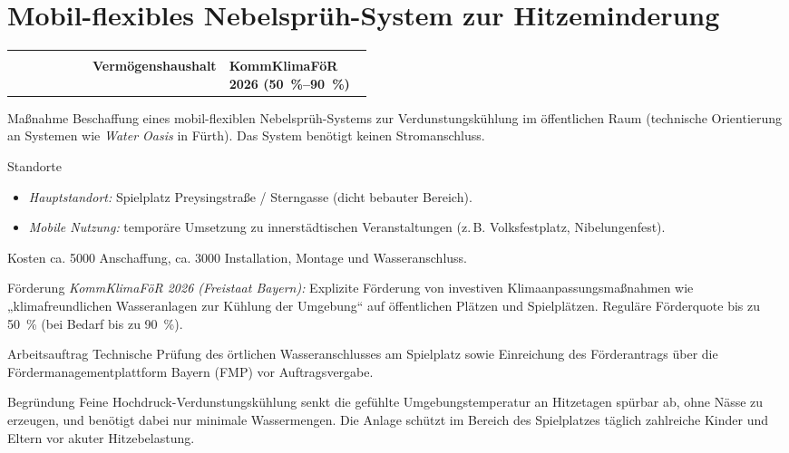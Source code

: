 \documentclass[11pt, a4paper]{article}
\makeatletter
\newcommand{\rubrik}[1]{{\small\bfseries\color{GruenAccent}\textls[80]{\MakeUppercase{#1}}}}
\newcommand{\kennzahl}[1]{\leavevmode{\scriptsize\color{Grau}\textls[60]{\MakeUppercase{#1}}}}
\newcommand{\massnahme}[3]{%
  \rubrik{#1}\par\nobreak\vspace{1mm}%
  \section{#2}\label{#3}}
\newcommand{\eckdaten}[3]{%
  \begin{tcolorbox}[enhanced, colback=GruenLight, frame hidden, arc=1.5mm,
      left=5mm, right=5mm, top=2.5mm, bottom=2.5mm, before skip=0pt, after skip=5mm]
    \begin{tabularx}{\linewidth}{@{}p{0.22\linewidth} p{0.24\linewidth} >{\raggedright\arraybackslash}X@{}}
      \kennzahl{Ansatz 2027} & \kennzahl{Haushalt} & \kennzahl{Förderung / Finanzierung} \\[0.5mm]
      \leavevmode{\Large\bfseries\color{GruenPrimary}#1} & \bfseries #2 & \bfseries #3
    \end{tabularx}
  \end{tcolorbox}}
\makeatother
\begin{document}
\clearpage


\massnahme{Hitzeschutz}{Mobil-flexibles Nebelsprüh-System zur Hitzeminderung}{m:nebel}

\eckdaten{\qty{8000}{\EUR}}{Vermögenshaushalt}{KommKlimaFöR 2026 (\SIrange{50}{90}{\percent})}

\begin{steckbrief}
  \item[Maßnahme] Beschaffung eines mobil-flexiblen Nebelsprüh-Systems zur Verdunstungskühlung im öffentlichen Raum (technische Orientierung an Systemen wie \textit{Water Oasis} in Fürth). Das System benötigt keinen Stromanschluss.
  \item[Standorte] \begin{itemize}
      \item \textit{Hauptstandort:} Spielplatz Preysingstraße / Sterngasse (dicht bebauter Bereich).
      \item \textit{Mobile Nutzung:} temporäre Umsetzung zu innerstädtischen Veranstaltungen (z.\,B. Volksfestplatz, Nibelungenfest).
    \end{itemize}
  \item[Kosten] ca. \qty{5000}{\EUR} Anschaffung, ca. \qty{3000}{\EUR} Installation, Montage und Wasseranschluss.
  \item[Förderung] \textit{KommKlimaFöR 2026 (Freistaat Bayern):} Explizite Förderung von investiven Klimaanpassungsmaßnahmen wie „klimafreundlichen Wasseranlagen zur Kühlung der Umgebung“ auf öffentlichen Plätzen und Spielplätzen. Reguläre Förderquote bis zu \SI{50}{\percent} (bei Bedarf bis zu \SI{90}{\percent}).
  \item[Arbeitsauftrag] Technische Prüfung des örtlichen Wasseranschlusses am Spielplatz sowie Einreichung des Förderantrags über die Fördermanagementplattform Bayern (FMP) vor Auftragsvergabe.
  \item[Begründung] Feine Hochdruck-Verdunstungskühlung senkt die gefühlte Umgebungstemperatur an Hitzetagen spürbar ab, ohne Nässe zu erzeugen, und benötigt dabei nur minimale Wassermengen. Die Anlage schützt im Bereich des Spielplatzes täglich zahlreiche Kinder und Eltern vor akuter Hitzebelastung.
\end{steckbrief}

\clearpage
\end{document}

